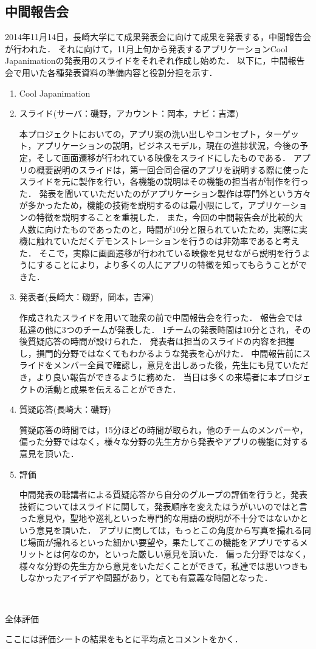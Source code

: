 \subsection{中間報告会}
\par
2014年11月14日，長崎大学にて成果発表会に向けて成果を発表する，中間報告会が行われた．
それに向けて，11月上旬から発表するアプリケーションCool Japanimationの発表用のスライドをそれぞれ作成し始めた．
以下に，中間報告会で用いた各種発表資料の準備内容と役割分担を示す．
\begin{enumerate}
\item Cool Japanimation　
\par
\item スライド(サーバ：磯野，アカウント：岡本，ナビ：吉澤) 
\par
本プロジェクトにおいての，アプリ案の洗い出しやコンセプト，ターゲット，アプリケーションの説明，ビジネスモデル，現在の進捗状況，今後の予定，そして画面遷移が行われている映像をスライドにしたものである．
アプリの概要説明のスライドは，第一回合同合宿のアプリを説明する際に使ったスライドを元に製作を行い，各機能の説明はその機能の担当者が制作を行った．
発表を聞いていただいたのがアプリケーション製作は専門外という方々が多かったため，機能の技術を説明するのは最小限にして，アプリケーションの特徴を説明することを重視した．
また，今回の中間報告会が比較的大人数に向けたものであったのと，時間が10分と限られていたため，実際に実機に触れていただくデモンストレーションを行うのは非効率であると考えた．
そこで，実際に画面遷移が行われている映像を見せながら説明を行うようにすることにより，より多くの人にアプリの特徴を知ってもらうことができた．
\item 発表者(長崎大：磯野，岡本，吉澤)
\par
作成されたスライドを用いて聴衆の前で中間報告会を行った．
報告会では私達の他に3つのチームが発表した．
1チームの発表時間は10分とされ，その後質疑応答の時間が設けられた．
発表者は担当のスライドの内容を把握し，損門的分野ではなくてもわかるような発表を心がけた．
中間報告前にスライドをメンバー全員で確認し，意見を出しあった後，先生にも見ていただき，より良い報告ができるように務めた．
当日は多くの来場者に本プロジェクトの活動と成果を伝えることができた． 
\item 質疑応答(長崎大：磯野) 
\par
質疑応答の時間では，15分ほどの時間が取られ，他のチームのメンバーや，偏った分野ではなく，様々な分野の先生方から発表やアプリの機能に対する意見を頂いた． 
\item 評価 
\par
中間発表の聴講者による質疑応答から自分のグループの評価を行うと，発表技術についてはスライドに関して，発表順序を変えたほうがいいのではと言った意見や，聖地や巡礼といった専門的な用語の説明が不十分ではないかという意見を頂いた．
アプリに関しては，もっとこの角度から写真を撮れる同じ場面が撮れるといった細かい要望や，果たしてこの機能をアプリでするメリットとは何なのか，といった厳しい意見を頂いた．
偏った分野ではなく，様々な分野の先生方から意見をいただくことができて，私達では思いつきもしなかったアイデアや問題があり，とても有意義な時間となった．
\end{enumerate}　
\par
全体評価
\par
ここには評価シートの結果をもとに平均点とコメントをかく．
